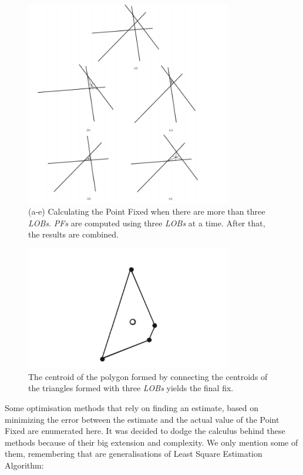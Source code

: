 \documentclass[english,purist]{ist-report}
\begin{document}
\begin{figure}[ht]
\centering
\includegraphics[width=90mm]{target8.png}
\caption{(a-e) Calculating the Point Fixed when there are more than three \textit{LOBs}. \textit{PFs} are computed using three \textit{LOBs} at a time. After that, the results are combined.}
\label{target8}
\end{figure} 



\begin{figure}[ht]
\centering
\includegraphics[width=90mm]{target9.png}
\caption{The centroid of the polygon formed by connecting the centroids of the triangles formed with three \textit{LOBs} yields the final fix.}
\label{target9}
\end{figure} 

Some optimisation methods that rely on finding an estimate, based on minimizing the error between the estimate and the actual value of the Point Fixed are enumerated here. It was decided to dodge the calculus behind these methods because of their big extension and complexity. We only mention some of them, remembering that are generalisations of Least Square Estimation Algorithm:
\end{document}
